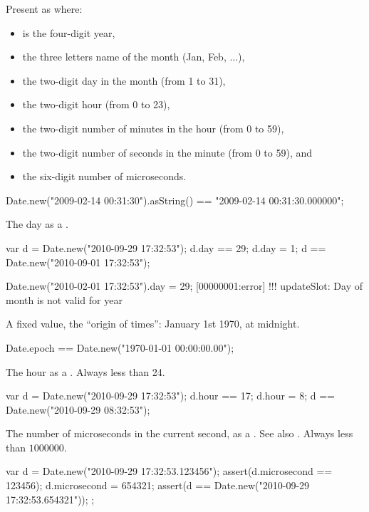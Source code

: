 \begin{urbiscriptapi}
\item[asString] Present as  where:
  \begin{itemize}
  \item {} is the four-digit year,
  \item {} the three letters name of the month (Jan, Feb, ...),
  \item {} the two-digit day in the month (from 1 to 31),
  \item {} the two-digit hour (from 0 to 23),
  \item {} the two-digit number of minutes in the hour (from 0 to 59),
  \item {} the two-digit number of seconds in the minute (from 0 to
    59), and
  \item {} the six-digit number of microseconds.
  \end{itemize}
\begin{urbiassert}
Date.new("2009-02-14 00:31:30").asString() == "2009-02-14 00:31:30.000000";
\end{urbiassert}


\item[day]
  The day as a .
\begin{urbiassert}
var d = Date.new("2010-09-29 17:32:53");
d.day == 29;
d.day = 1;
d == Date.new("2010-09-01 17:32:53");
\end{urbiassert}
\begin{urbiscript}
Date.new("2010-02-01 17:32:53").day = 29;
[00000001:error] !!! updateSlot: Day of month is not valid for year
\end{urbiscript}


\item[epoch]
  A fixed value, the ``origin of times'': January 1st 1970, at
  midnight.
\begin{urbiunchecked}
Date.epoch == Date.new("1970-01-01 00:00:00.00");
\end{urbiunchecked}


\item[hour]
  The hour as a .  Always less than 24.
\begin{urbiassert}
var d = Date.new("2010-09-29 17:32:53");
d.hour == 17;
d.hour = 8;
d == Date.new("2010-09-29 08:32:53");
\end{urbiassert}

\item[microsecond]%
  The number of microseconds in the current second, as a .
  See also .  Always less than $1000 000$.
\begin{urbiscript}
{
  var d = Date.new("2010-09-29 17:32:53.123456");
  assert(d.microsecond == 123456);
  d.microsecond = 654321;
  assert(d == Date.new("2010-09-29 17:32:53.654321"));
};
\end{urbiscript}


\end{urbiscriptapi}
